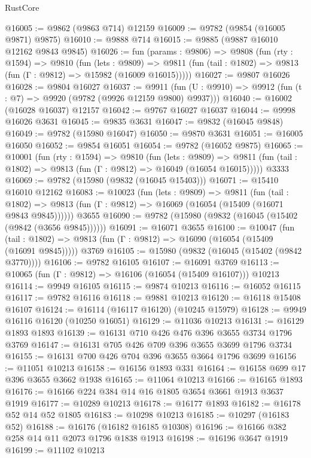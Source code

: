 \begin{lexlean}{RustCore}
\begin{coremodule}
@16005 := @9862 (@9863 @714) @12159
@16009 := @9782 (@9854 (@16005 @9871) @9875)
@16010 := @9888 @714
@16015 := @9885 (@9887 @16010 @12162 @9843 @9845)
@16026 := fun (params : @9806) =>
  @9808
    (fun (rty : @1594) =>
    @9810
      (fun (lets : @9809) =>
      @9811 (fun (tail : @1802) => @9813 (fun (Γ : @9812) => @15982 (@16009 @16015)))))
@16027 := @9807 @16026
@16028 := @9804 @16027
@16037 := @9911
    (fun (U : @9910) => @9912 (fun (t : @7) => @9920 (@9782 (@9926 @12159 @9800) @9937)))
@16040 := @16002 (@16028 @16037) @12157
@16042 := @9767 @16027 @16037
@16044 := @9998 @16026 @3631
@16045 := @9835 @3631
@16047 := @9832 (@16045 @9848)
@16049 := @9782 (@15980 @16047)
@16050 := @9870 @3631
@16051 := @16005 @16050
@16052 := @9854 @16051
@16054 := @9782 (@16052 @9875)
@16065 := @10001
    (fun (rty : @1594) =>
    @9810
      (fun (lets : @9809) =>
      @9811 (fun (tail : @1802) => @9813 (fun (Γ : @9812) => @16049 (@16054 @16015)))))
    @3333
@16069 := @9782 (@15980 (@9832 (@16045 @15403)))
@16071 := @15410 @16010 @12162
@16083 := @10023
    (fun (lets : @9809) =>
    @9811
      (fun (tail : @1802) =>
      @9813 (fun (Γ : @9812) => @16069 (@16054 (@15409 (@16071 @9843 @9845))))))
    @3655
@16090 := @9782 (@15980 (@9832 (@16045 (@15402 (@9842 (@3656 @9845))))))
@16091 := @16071 @3655
@16100 := @10047
    (fun (tail : @1802) => @9813 (fun (Γ : @9812) => @16090 (@16054 (@15409 (@16091 @9845)))))
    @3769
@16105 := @15980 (@9832 (@16045 (@15402 (@9842 @3770))))
@16106 := @9782 @16105
@16107 := @16091 @3769
@16113 := @10065 (fun (Γ : @9812) => @16106 (@16054 (@15409 @16107))) @10213
@16114 := @9949 @16105
@16115 := @9874 @10213
@16116 := @16052 @16115
@16117 := @9782 @16116
@16118 := @9881 @10213
@16120 := @16118 @15408 @16107
@16124 := @16114 (@16117 @16120) (@10245 @15979)
@16128 := @9949 @16116 @16120 (@10250 @16051)
@16129 := @11036 @10213
@16131 := @16129 @1893 @1893
@16139 := @16131 @710 @426 @476 @396 @3655 @3734 @1796 @3769
@16147 := @16131 @705 @426 @709 @396 @3655 @3699 @1796 @3734
@16155 := @16131 @700 @426 @704 @396 @3655 @3664 @1796 @3699
@16156 := @11051 @10213
@16158 := @16156 @1893 @331
@16164 := @16158 @699 @17 @396 @3655 @3662 @1938
@16165 := @11064 @10213
@16166 := @16165 @1893
@16176 := @16166 @224 @384 @14 @16 @1805 @3654 @3661 @1913 @3637 @1919
@16177 := @10289 @10213
@16178 := @16177 @1893
@16182 := @16178 @52 @14 @52 @1805
@16183 := @10298 @10213
@16185 := @10297 (@16183 @52)
@16188 := @16176 (@16182 @16185 @10308)
@16196 := @16166 @382 @258 @14 @11 @2073 @1796 @1838 @1913
@16198 := @16196 @3647 @1919
@16199 := @11102 @10213

\end{coremodule}
\end{lexlean}
